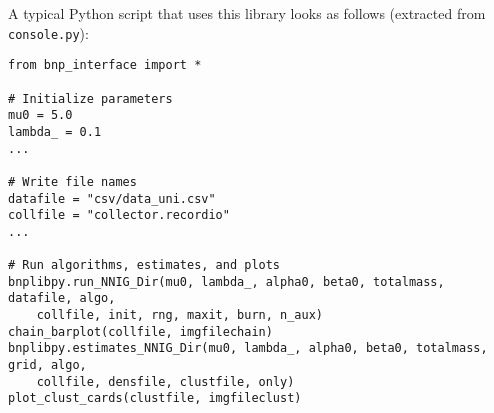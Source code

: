 A typical Python script that uses this library looks as follows (extracted from \verb|console.py|):
\begin{verbatim}
from bnp_interface import *

# Initialize parameters
mu0 = 5.0
lambda_ = 0.1
...

# Write file names
datafile = "csv/data_uni.csv"
collfile = "collector.recordio"
...

# Run algorithms, estimates, and plots
bnplibpy.run_NNIG_Dir(mu0, lambda_, alpha0, beta0, totalmass, datafile, algo,
    collfile, init, rng, maxit, burn, n_aux)
chain_barplot(collfile, imgfilechain)
bnplibpy.estimates_NNIG_Dir(mu0, lambda_, alpha0, beta0, totalmass, grid, algo,
    collfile, densfile, clustfile, only)
plot_clust_cards(clustfile, imgfileclust)
\end{verbatim}
